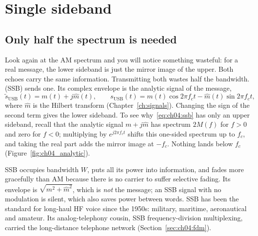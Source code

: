 \section{Single sideband}
\label{sec:ch04:ssb}

\subsection{Only half the spectrum is needed}

Look again at the AM spectrum and you will notice something wasteful: for a real message, the lower
sideband is just the mirror image of the upper. Both echoes carry the same information. Transmitting
both wastes half the bandwidth.  (SSB) sends one. Its complex envelope is the
analytic signal of the message,
\begin{equation}
\tilde s_{\text{USB}}(t)=m(t)+j\hat m(t),\qquad
s_{\text{USB}}(t)=m(t)\cos 2\pi f_c t-\hat m(t)\sin 2\pi f_c t,
\label{eq:ch04:ssb}
\end{equation}
where $\hat m$ is the Hilbert transform (Chapter~\ref{ch:signals}). Changing the sign of the second term
gives the lower sideband. To see why~\eqref{eq:ch04:ssb} has only an upper sideband, recall that the
analytic signal $m+j\hat m$ has spectrum $2M(f)$ for $f>0$ and zero for $f<0$; multiplying by
$e^{j2\pi f_ct}$ shifts this one-sided spectrum up to $f_c$, and taking the real part adds the mirror
image at $-f_c$. Nothing lands below $f_c$ (Figure~\ref{fig:ch04_analytic}).


SSB occupies bandwidth $W$, puts all its power into information, and fades more gracefully than AM
because there is no carrier to suffer selective fading. Its envelope is $\sqrt{m^2+\hat m^2}$, which is
\emph{not} the message; an SSB signal with no modulation is silent, which also saves power between words.
SSB has been the standard for long-haul HF voice since the 1950s: military, maritime, aeronautical and
amateur. Its analog-telephony cousin, SSB frequency-division multiplexing, carried the long-distance
telephone network (Section~\ref{sec:ch04:fdm}).

